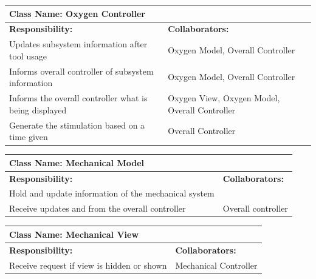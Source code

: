 \documentclass[12pt, titlepage]{article}
\begin{document}
	\begin{table}[H]
		\centering
		\begin{tabular}{|p{10cm}|p{5cm}|}
		\hline 
		 \multicolumn{2}{|l|}{\textbf{Class Name: Oxygen Controller}} \\
		\hline
		\textbf{Responsibility:} & \textbf{Collaborators:} \\
		\hline
		Updates subsystem information after tool usage & Oxygen Model, Overall Controller\\
		\hline
		 Informs overall controller of subsystem information & Oxygen Model, Overall Controller\\
		\hline
		 Informs the overall controller what is being displayed & Oxygen View, Oxygen Model, Overall Controller\\
		\hline
		 Generate the stimulation based on a time given & Overall Controller \\
		\hline
		\end{tabular}
	\end{table}

	\begin{table}[H]
		\centering
		\begin{tabular}{|p{10cm}|p{5cm}|}
		\hline 
		 \multicolumn{2}{|l|}{\textbf{Class Name: Mechanical Model}} \\
		\hline
		\textbf{Responsibility:} & \textbf{Collaborators:} \\
		\hline
		 Hold and update information of the mechanical system & \\
		\hline
		Receive updates and from the overall controller & Overall controller \\
		\hline
		\end{tabular}
	\end{table}

	\begin{table}[H]
		\centering
		\begin{tabular}{|p{10cm}|p{5cm}|}
		\hline 
		 \multicolumn{2}{|l|}{\textbf{Class Name: Mechanical View}} \\
		\hline
		\textbf{Responsibility:} & \textbf{Collaborators:} \\
		\hline
		 Receive request if view is hidden or shown & Mechanical Controller\\
		\hline
		\end{tabular}
	\end{table}
\end{document}
